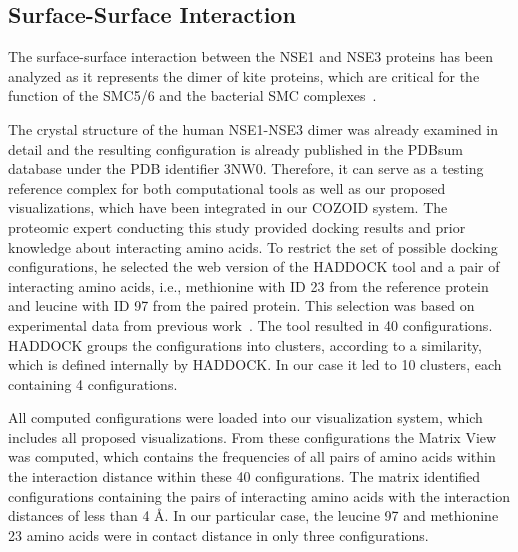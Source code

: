 \documentclass[twocolumn]{bmcart}%
\def\MatView {Matrix View\xspace}
\begin{document}
\subsection{Surface-Surface Interaction}
The surface-surface interaction between the NSE1 and NSE3 proteins has been analyzed as it represents the dimer of kite proteins, which are critical for the function of the SMC5/6 and the bacterial SMC complexes~\cite{Zabrady2016,Palecek2015,Doyle2010}. 

The crystal structure of the human NSE1-NSE3 dimer was already examined in detail and the resulting configuration is already published in the PDBsum database under the PDB identifier 3NW0. 
Therefore, it can serve as a testing reference complex for both computational tools as well as our proposed visualizations, which have been integrated in our COZOID system.
The proteomic expert conducting this study provided docking results and prior knowledge about interacting amino acids.
To restrict the set of possible docking configurations, he selected the web version of the HADDOCK tool and a pair of interacting amino acids, i.e., methionine with ID 23 from the reference protein and leucine with ID 97 from the paired protein.
This selection was based on experimental data from previous work~\cite{Hudson2011,Kozakova,Crabben}.
The tool resulted in 40 configurations.
HADDOCK groups the configurations into clusters, according to a similarity, which is defined internally by HADDOCK.
In our case it led to 10 clusters, each containing 4 configurations.

All computed configurations were loaded into our visualization system, which includes all proposed visualizations.
From these configurations the \MatView was computed, which contains the frequencies of all pairs of amino acids within the interaction distance within these 40 configurations.
The matrix identified configurations containing the pairs of interacting amino acids with the interaction distances of less than 4 \AA.
In our particular case, the leucine 97 and methionine 23 amino acids were in contact distance in only three configurations.
\end{document}
